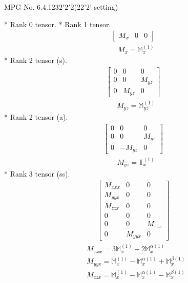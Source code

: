 \documentclass[fleqn,8pt,landscape]{jsarticle}
\begin{document}
\setcounter{MaxMatrixCols}{32}

\renewcommand{\tablename}{Table~}
\renewcommand{\figurename}{Figure~}
\begin{center}
\LARGE
MPG No. 6.4.123\quad$2'2'2$\quad(22'2' setting)
\end{center}
* Rank 0 tensor.
* Rank 1 tensor.
\begin{align*}
\begin{bmatrix} M_{x} & 0 & 0 \end{bmatrix}
\end{align*}
\begin{align*}
& M_{x} = \mathbb{M}_{x}^{(1)}
\end{align*}
* Rank 2 tensor (s).
\begin{align*}
\begin{bmatrix} 0 & 0 & 0 \\ 0 & 0 & M_{yz} \\ 0 & M_{yz} & 0 \end{bmatrix}
\end{align*}
\begin{align*}
& M_{yz} = \mathbb{M}_{yz}^{(1)}
\end{align*}
* Rank 2 tensor (a).
\begin{align*}
\begin{bmatrix} 0 & 0 & 0 \\ 0 & 0 & M_{yz} \\ 0 & - M_{yz} & 0 \end{bmatrix}
\end{align*}
\begin{align*}
& M_{yz} = \mathbb{T}_{x}^{(1)}
\end{align*}
* Rank 3 tensor (ss).
\begin{align*}
\begin{bmatrix} M_{xxx} & 0 & 0 \\ M_{yyx} & 0 & 0 \\ M_{zzx} & 0 & 0 \\ 0 & 0 & 0 \\ 0 & 0 & M_{zzx} \\ 0 & M_{yyx} & 0 \end{bmatrix}
\end{align*}
\begin{align*}
& M_{xxx} = 3 \mathbb{M}_{x}^{(1)} + 2 \mathbb{M}_{x}^{\alpha(1)} \\
& M_{yyx} = \mathbb{M}_{x}^{(1)} - \mathbb{M}_{x}^{\alpha(1)} + \mathbb{M}_{x}^{\beta(1)} \\
& M_{zzx} = \mathbb{M}_{x}^{(1)} - \mathbb{M}_{x}^{\alpha(1)} - \mathbb{M}_{x}^{\beta(1)}
\end{align*}
\end{document}
